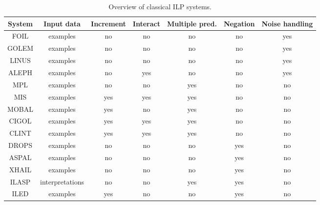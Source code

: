 \begin{table}[t]
\centering
\begin{tabular}{|c|c|c|c|c|c|c|}
\hline
System & Input data&Increment & Interact & Multiple pred. & Negation&Noise handling\\
\hline
FOIL \cite{foil} & examples&no & no & no &no &yes \\
GOLEM \cite{golem} &examples& no & no & no &no& yes \\
LINUS \cite{linus} &examples& no & no & no &no& yes \\
ALEPH \cite{aleph} &examples& no & yes & no &no& yes \\
MPL \cite{mpl} &examples& no & no & yes &no& no \\
MIS \cite{mis} &examples& yes & yes & yes &no& no \\
MOBAL \cite{mobal} &examples& yes & no & yes &no& no \\
CIGOL \cite{cigol} &examples& yes & yes & yes&no & no \\
CLINT \cite{clint} &examples& yes & yes & yes &no& no \\
DROPS \cite{CorapiRL10}&examples&no&no&no&yes&no\\
ASPAL \cite{ASPAL}&examples&no&no&no&yes&no\\
XHAIL \cite{XHAIL}&examples&no&no&no&yes&no\\
ILASP \cite{ILASP_system}&interpretations&no&no&yes&yes&no\\
ILED \cite{ILED}&examples&yes&no&no&yes&no\\
\hline
\end{tabular}
\caption{Overview of classical ILP systems.}
\label{tab:ilp}
\end{table}